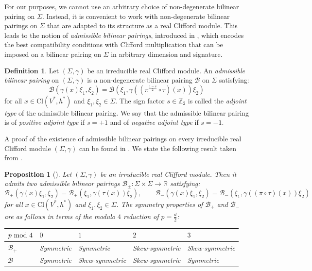 \documentclass[10pt,reqno]{amsart}
\newtheorem{proposition}[theorem]{Proposition}
\theoremstyle{definition}
\newtheorem{definition}[theorem]{Definition}
\theoremstyle{remark}
\newcommand{\Z}{\mathbb{Z}}
\newcommand{\R}{\mathbb{R}}
\begin{document}
For our purposes, we cannot use an arbitrary choice of non-degenerate bilinear pairing on $\Sigma$. Instead, it is convenient to work with non-degenerate bilinear pairings on $\Sigma$ that are adapted to its structure as a real Clifford module. This leads to the notion of \emph{admissible bilinear pairings}, introduced in \cite{Alekseevsky_Cortes1997,ACDVP2005}, which encodes the best compatibility conditions with Clifford multiplication that can be imposed on a bilinear pairing on $\Sigma$ in arbitrary dimension and signature.

\begin{definition}
    Let $(\Sigma,\gamma)$ be an irreducible real Clifford module. An \emph{admissible bilinear pairing} on $(\Sigma,\gamma)$ is a non-degenerate bilinear pairing $\mathscr{B}$ on $\Sigma$ satisfying: \begin{equation*}\label{eq:admissible_pairing}
        \mathscr{B}(\gamma(x)\xi_1,\xi_2)=\mathscr{B}(\xi_1,\gamma((\pi^{\frac{1-s}{2}}\circ\tau)(x))\xi_2)
    \end{equation*} for all $x\in\mathrm{Cl}(V^*,h^*)$ and $\xi_1,\xi_2\in\Sigma$. The sign factor $s\in\Z_2$ is called the \emph{adjoint type} of the admissible bilinear pairing. We say that the admissible bilinear pairing is of \emph{positive adjoint type} if $s=+1$ and of \emph{negative adjoint type} if $s=-1$.
\end{definition}

A proof of the existence of admissible bilinear pairings on every irreducible real Clifford module $(\Sigma,\gamma)$ can be found in \cite{Alekseevsky_Cortes1997,ACDVP2005,Harvey1990,Meinrenken2013}. We state the following result taken from \cite{Cortes_Lazaroiu_Shahbazi2021}.

\begin{proposition}[{\cite[Thm.\ 3.1]{Cortes_Lazaroiu_Shahbazi2021}}]\label{prop:admissible_bilinear_pairings}
    Let $(\Sigma,\gamma)$ be an irreducible real Clifford module. Then it admits two admissible bilinear pairings $\mathscr{B}_\pm\colon\Sigma\times\Sigma\to\R$ satisfying: $$\mathscr{B}_+(\gamma(x)\xi_1,\xi_2)=\mathscr{B}_+(\xi_1,\gamma(\tau(x))\xi_2),\qquad\mathscr{B}_-(\gamma(x)\xi_1,\xi_2)=\mathscr{B}_-(\xi_1,\gamma((\pi\circ\tau)(x))\xi_2)$$ for all $x\in\mathrm{Cl}(V^*,h^*)$ and $\xi_1,\xi_2\in\Sigma$. The symmetry properties of $\mathscr{B}_+$ and $\mathscr{B}_-$ are as follows in terms of the modulo $4$ reduction of $p=\frac{d}{2}$:

    \begin{center}
    \begin{tabular}{lllll}
    \hline
    $p\textnormal{ mod }4$&$0$&$1$&$2$&$3$\\
    \hline
    $\mathscr{B}_+$&\textnormal{Symmetric}&\textnormal{Symmetric}&\textnormal{Skew-symmetric}&\textnormal{Skew-symmetric}\\
    \hline
    $\mathscr{B}_-$&\textnormal{Symmetric}&\textnormal{Skew-symmetric}&\textnormal{Skew-symmetric}&\textnormal{Symmetric}\\
    \hline
    \end{tabular}
    \end{center}
\end{proposition}
\end{document}
